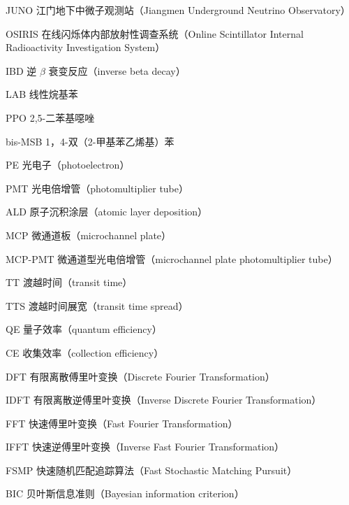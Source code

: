 
\begin{denotation}[3cm]
  \item[JUNO] 江门地下中微子观测站（Jiangmen Underground Neutrino Observatory）
  \item[OSIRIS] 在线闪烁体内部放射性调查系统（Online Scintillator Internal Radioactivity Investigation System）
  \item[IBD] 逆 $\beta$ 衰变反应（inverse beta decay）
  \item[LAB] 线性烷基苯
  \item[PPO] 2,5-二苯基噁唑
  \item[bis-MSB] 1，4-双（2-甲基苯乙烯基）苯
  \item[PE] 光电子（photoelectron）
  \item[PMT] 光电倍增管（photomultiplier tube）
  \item[ALD] 原子沉积涂层（atomic layer deposition）
  \item[MCP] 微通道板（microchannel plate）
  \item[MCP-PMT] 微通道型光电倍增管（microchannel plate photomultiplier tube）
  \item[TT] 渡越时间（transit time）
  \item[TTS] 渡越时间展宽（transit time spread）
  \item[QE] 量子效率（quantum efficiency）
  \item[CE] 收集效率（collection efficiency）
  \item[DFT] 有限离散傅里叶变换（Discrete Fourier Transformation）
  \item[IDFT] 有限离散逆傅里叶变换（Inverse Discrete Fourier Transformation）
  \item[FFT] 快速傅里叶变换（Fast Fourier Transformation）
  \item[IFFT] 快速逆傅里叶变换（Inverse Fast Fourier Transformation）
  \item[FSMP] 快速随机匹配追踪算法（Fast Stochastic Matching Pursuit）
  \item[BIC] 贝叶斯信息准则（Bayesian information criterion）
\end{denotation}





